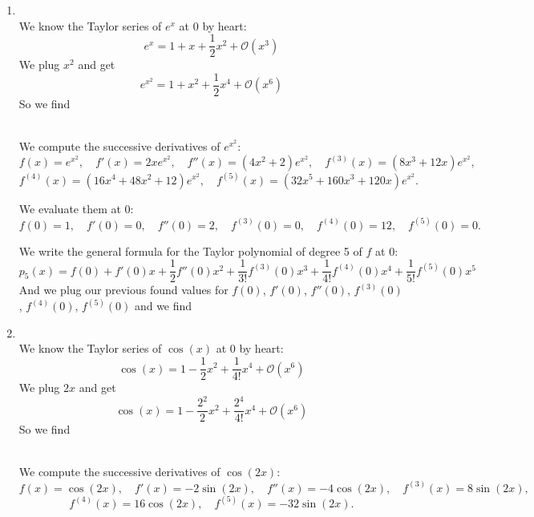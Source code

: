 \documentclass[pdftex,11pt]{article}
\begin{document}
\begin{enumerate}

\item
{}\\

We know the Taylor series of $e^x$ at $0$ by heart:
$$ e^x = 1 + x + \frac{1}{2}x^2 + \mathcal{O}(x^3)$$
We plug $x^2$ and get
$$ e^{x^2} = 1 + x^2 + \frac{1}{2}x^4 + \mathcal{O}(x^6)$$
So we find 
\begin{center}
\end{center}

\\

We compute the successive derivatives of $e^{x^2}$:
$$ 
f(x) = e^{x^2},
\quad
f'(x) = 2xe^{x^2},
\quad
f''(x) = (4x^2+2)e^{x^2},
\quad
f^{(3)}(x) = (8x^3+12x)e^{x^2},
$$
$$
f^{(4)}(x) = (16x^4+48x^2+12)e^{x^2},
\quad
f^{(5)}(x) = (32x^5+160x^3+120x)e^{x^2}.
$$

We evaluate them at $0$:
$$ 
f(0) = 1,
\quad
f'(0) = 0,
\quad
f''(0) = 2,
\quad
f^{(3)}(0) = 0,
\quad
f^{(4)}(0) = 12,
\quad
f^{(5)}(0) = 0.
$$

We write the general formula for the Taylor polynomial of degree 5 of $f$ at $0$:
$$ 
p_5(x) = f(0) + f'(0) x + \frac{1}{2} f''(0) x^2 + \frac{1}{3!} f^{(3)}(0) x^3 + \frac{1}{4!} f^{(4)}(0) x^4 + \frac{1}{5!} f^{(5)}(0) x^5
$$
And we plug our previous found values for $f(0)$, $f'(0)$,
$f''(0)$,
$f^{(3)}(0)$,
$f^{(4)}(0)$,
$f^{(5)}(0)$
and we find
\begin{center}
\end{center}


\item
{}\\

We know the Taylor series of $\cos(x)$ at $0$ by heart:
$$ \cos(x) = 1 - \frac{1}{2}x^2 + \frac{1}{4!}x^4 + \mathcal{O}(x^6)$$
We plug $2x$ and get
$$ \cos(x) = 1 - \frac{2^2}{2}x^2 + \frac{2^4}{4!}x^4 + \mathcal{O}(x^6)$$
So we find 
\begin{center}
\end{center}


\\


We compute the successive derivatives of $\cos(2x)$:
$$ 
f(x) = \cos(2x),
\quad
f'(x) = -2\sin(2x),
\quad
f''(x) = -4\cos(2x),
\quad
f^{(3)}(x) =  8\sin(2x),
$$$$
f^{(4)}(x) = 16\cos(2x),
\quad
f^{(5)}(x) = -32\sin(2x).
$$


\end{enumerate}
\end{document}
